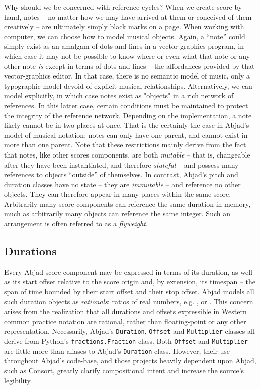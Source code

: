 \noindent Why should we be concerned with reference cycles? When we create
score by hand, notes -- no matter how we may have arrived at them or conceived
of them creatively -- are ultimately simply black marks on a page. When working
with computer, we can choose how to model musical objects. Again, a
\enquote{note} could simply exist as an amalgam of dots and lines in a
vector-graphics program, in which case it may not be possible to know where or
even what that note or any other note \emph{is} except in terms of dots and
lines -- the affordances provided by that vector-graphics editor. In that case,
there is no semantic model of music, only a typographic model devoid of
explicit musical relationships. Alternatively, we can model explicitly, in
which case notes exist as "objects" in a rich network of references. In this
latter case, certain conditions must be maintained to protect the integrity of
the reference network. Depending on the implementation, a note likely cannot
be in two places at once. That is the certainly the case in Abjad's model of
musical notation: notes can only have one parent, and cannot exist in more than
one parent. Note that these restrictions mainly derive from the fact that
notes, like other scores components, are both \emph{mutable} -- that is,
changeable after they have been instantiated, and therefore \emph{stateful} --
and possess many references to objects \enquote{outside} of themselves. In
contrast, Abjad's pitch and duration classes have no state -- they are
\emph{immutable} -- and reference no other objects. They can therefore appear
in many places within the same score. Arbitrarily many score components can
reference the same duration in memory, much as arbitrarily many objects can
reference the same integer. Such an arrangement is often referred to as a
\emph{flyweight}\cite{gamma1994design}.

\subsection{Durations}

Every Abjad score component may be expressed in terms of its duration, as well
as its start offset relative to the score origin and, by extension, its
timespan -- the span of time bounded by their start offset and their stop
offset. Abjad models all such duration objects as \emph{rationals}: ratios of
real numbers, e.g. ,  or . This concern
arises from the realization that all durations and offsets expressible in
Western common practice notation are rational, rather than floating-point or
any other representation. Necessarily, Abjad's \texttt{Duration},
\texttt{Offset} and \texttt{Multiplier} classes all derive from Python's
\texttt{fractions.Fraction} class. Both \texttt{Offset} and \texttt{Multiplier}
are little more than aliases to Abjad's \texttt{Duration} class. However, their
use throughout Abjad's code-base, and those projects heavily dependent upon
Abjad, such as Consort, greatly clarify compositional intent and increase the
source's legibility.

